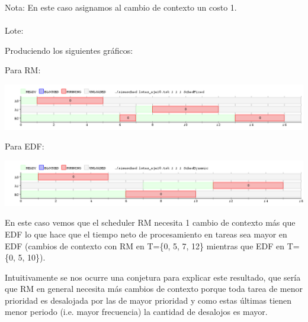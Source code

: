 Nota: En este caso asignamos al cambio de contexto un costo 1.
\\
\\
Lote:


Produciendo los siguientes gráficos:

Para RM:

\begin{center}
\includegraphics[scale=0.4]{graficos/eje10_Fixed.png}
\end{center}

Para EDF:

\begin{center}
\includegraphics[scale=0.4]{graficos/eje10_Dynamic.png}
\end{center}

En este caso vemos que el scheduler RM necesita 1 cambio de contexto más que EDF lo que hace que el tiempo neto de procesamiento en tareas sea mayor en EDF (cambios de contexto con RM en T=\{0, 5, 7, 12\} mientras que EDF en T=\{0, 5, 10\}).

Intuitivamente se nos ocurre una conjetura para explicar este resultado, que sería que RM en general necesita más cambios de contexto porque toda tarea de menor prioridad es desalojada por las de mayor prioridad y como estas últimas tienen menor periodo (i.e. mayor frecuencia) la cantidad de desalojos es mayor.







